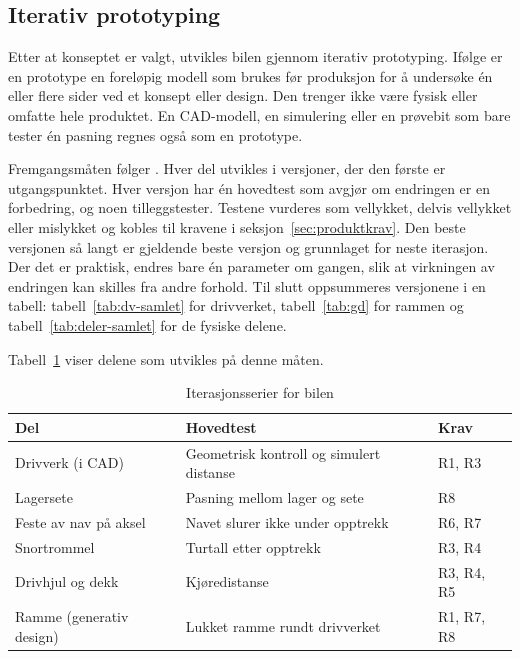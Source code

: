 \subsection{Iterativ prototyping}
\label{sec:iterativ-prototyping}
Etter at konseptet er valgt, utvikles bilen gjennom iterativ prototyping. Ifølge \textcite{camburn_2017} er en prototype en foreløpig modell som brukes før produksjon for å undersøke én eller flere sider ved et konsept eller design. Den trenger ikke være fysisk eller omfatte hele produktet. En CAD-modell, en simulering eller en prøvebit som bare tester én pasning regnes også som en prototype.

Fremgangsmåten følger \textcite{espedal_2024}. Hver del utvikles i versjoner, der den første er utgangspunktet. Hver versjon har én hovedtest som avgjør om endringen er en forbedring, og noen tilleggstester. Testene vurderes som vellykket, delvis vellykket eller mislykket og kobles til kravene i seksjon~\ref{sec:produktkrav}. Den beste versjonen så langt er gjeldende beste versjon og grunnlaget for neste iterasjon. Der det er praktisk, endres bare én parameter om gangen, slik at virkningen av endringen kan skilles fra andre forhold. Til slutt oppsummeres versjonene i en tabell: tabell~\ref{tab:dv-samlet} for drivverket, tabell~\ref{tab:gd} for rammen og tabell~\ref{tab:deler-samlet} for de fysiske delene.

Tabell~\ref{tab:iterasjonsserier} viser delene som utvikles på denne måten.


\begin{table}[H]
    \centering
    \caption{Iterasjonsserier for bilen}
    \label{tab:iterasjonsserier}
    \small
    \renewcommand{\arraystretch}{1.3}
    \begin{tabular}{|p{3.6cm}|p{6.0cm}|l|}
        \hline
        \textbf{Del} & \textbf{Hovedtest} & \textbf{Krav} \\
        \hline
        Drivverk (i CAD) & Geometrisk kontroll og simulert distanse & R1, R3 \\
        \hline
        Lagersete & Pasning mellom lager og sete & R8 \\
        \hline
        Feste av nav på aksel & Navet slurer ikke under opptrekk & R6, R7 \\
        \hline
        Snortrommel & Turtall etter opptrekk & R3, R4 \\
        \hline
        Drivhjul og dekk & Kjøredistanse & R3, R4, R5 \\
        \hline
        Ramme (generativ design) & Lukket ramme rundt drivverket & R1, R7, R8 \\
        \hline
    \end{tabular}
\end{table}

